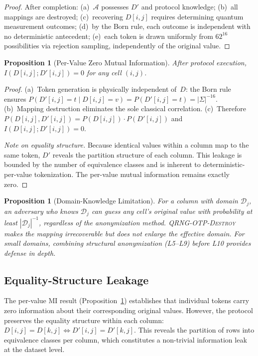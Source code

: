 \documentclass[acmsmall,screen,review,anonymous]{acmart}
\newtheorem{proposition}[theorem]{Proposition}
\begin{document}
\begin{proof}
After completion: (a)~$\mathcal{A}$ possesses $D'$ and protocol knowledge; (b)~all mappings are destroyed; (c)~recovering $D[i,j]$ requires determining quantum measurement outcomes; (d)~by the Born rule, each outcome is independent with no deterministic antecedent; (e)~each token is drawn uniformly from $62^{16}$ possibilities via rejection sampling, independently of the original value.
\end{proof}

\begin{proposition}[Per-Value Zero Mutual Information]
\label{prop:mi}
After protocol execution, $I(D[i,j]; D'[i,j]) = 0$ for any cell $(i,j)$.
\end{proposition}

\begin{proof}
(a)~Token generation is physically independent of~$D$: the Born rule ensures $P(D'[i,j] {=} t \mid D[i,j] {=} v) = P(D'[i,j] {=} t) = |\Sigma|^{-16}$. (b)~Mapping destruction eliminates the sole classical correlation. (c)~Therefore $P(D[i,j], D'[i,j]) = P(D[i,j]) \cdot P(D'[i,j])$ and $I(D[i,j]; D'[i,j]) = 0$.

\emph{Note on equality structure.} Because identical values within a column map to the same token, $D'$ reveals the partition structure of each column. This leakage is bounded by the number of equivalence classes and is inherent to deterministic-per-value tokenization. The per-value mutual information remains exactly zero.
\end{proof}

\begin{proposition}[Domain-Knowledge Limitation]
\label{prop:domainlimit}
For a column with domain $\mathcal{D}_j$, an adversary who knows $\mathcal{D}_j$ can guess any cell's original value with probability at least $|\mathcal{D}_j|^{-1}$, regardless of the anonymization method. \textsc{QRNG-OTP-Destroy} makes the mapping irrecoverable but does not enlarge the effective domain. For small domains, combining structural anonymization (L5--L9) before L10 provides defense in depth.
\end{proposition}

\subsection{Equality-Structure Leakage}
\label{subsec:equality}

The per-value MI result (Proposition~\ref{prop:mi}) establishes that individual tokens carry zero information about their corresponding original values. However, the protocol preserves the equality structure within each column: $D[i,j] = D[k,j] \iff D'[i,j] = D'[k,j]$. This reveals the partition of rows into equivalence classes per column, which constitutes a non-trivial information leak at the dataset level.
\end{document}
